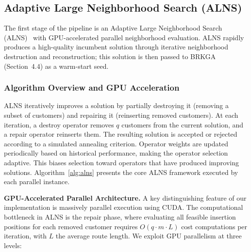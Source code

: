 \documentclass{article}
\begin{document}
\subsection{Adaptive Large Neighborhood Search (ALNS)}

The first stage of the pipeline is an Adaptive Large Neighborhood Search (ALNS)~\cite{ropke2006adaptive} with GPU-accelerated parallel neighborhood evaluation. ALNS rapidly produces a high-quality incumbent solution through iterative neighborhood destruction and reconstruction; this solution is then passed to BRKGA (Section~4.4) as a warm-start seed.

\subsubsection{Algorithm Overview and GPU Acceleration}

ALNS iteratively improves a solution by partially destroying it (removing a subset of customers) and repairing it (reinserting removed customers). At each iteration, a destroy operator removes $q$ customers from the current solution, and a repair operator reinserts them. The resulting solution is accepted or rejected according to a simulated annealing criterion. Operator weights are updated periodically based on historical performance, making the operator selection adaptive. This biases selection toward operators that have produced improving solutions. Algorithm~\ref{alg:alns} presents the core ALNS framework executed by each parallel instance.

\textbf{GPU-Accelerated Parallel Architecture.} A key distinguishing feature of our implementation is massively parallel execution using CUDA. The computational bottleneck in ALNS is the repair phase, where evaluating all feasible insertion positions for each removed customer requires $O(q \cdot m \cdot L)$ cost computations per iteration, with $L$ the average route length. We exploit GPU parallelism at three levels:
\end{document}
